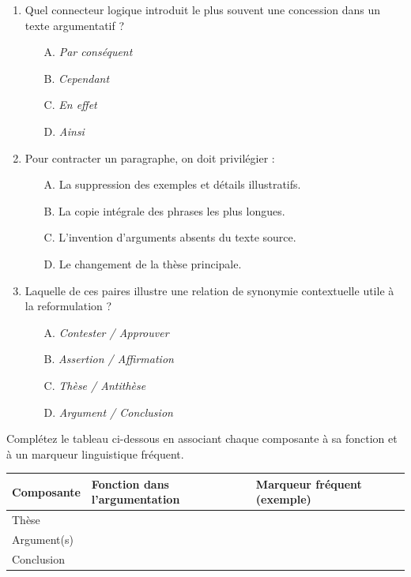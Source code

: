 \documentclass[11pt]{article}
\begin{document}
\begin{exercice}
\begin{enumerate}
    \item Quel connecteur logique introduit le plus souvent une concession dans un texte argumentatif ?
    \begin{itemize}
        \item[A.] \textit{Par conséquent}
        \item[B.] \textit{Cependant}
        \item[C.] \textit{En effet}
        \item[D.] \textit{Ainsi}
    \end{itemize}
    \item Pour contracter un paragraphe, on doit privilégier :
    \begin{itemize}
        \item[A.] La suppression des exemples et détails illustratifs.
        \item[B.] La copie intégrale des phrases les plus longues.
        \item[C.] L'invention d'arguments absents du texte source.
        \item[D.] Le changement de la thèse principale.
    \end{itemize}
    \item Laquelle de ces paires illustre une relation de synonymie contextuelle utile à la reformulation ?
    \begin{itemize}
        \item[A.] \textit{Contester / Approuver}
        \item[B.] \textit{Assertion / Affirmation}
        \item[C.] \textit{Thèse / Antithèse}
        \item[D.] \textit{Argument / Conclusion}
    \end{itemize}
\end{enumerate}
\end{exercice}

\begin{exercice}
Complétez le tableau ci-dessous en associant chaque composante à sa fonction et à un marqueur linguistique fréquent.

\begin{tabularx}{\linewidth}{|X|X|X|}
\hline
\textbf{Composante} & \textbf{Fonction dans l'argumentation} & \textbf{Marqueur fréquent (exemple)} \\
\hline
Thèse &  &  \\
\hline
Argument(s) &  &  \\
\hline
Conclusion &  &  \\
\hline
\end{tabularx}
\end{exercice}
\end{document}
